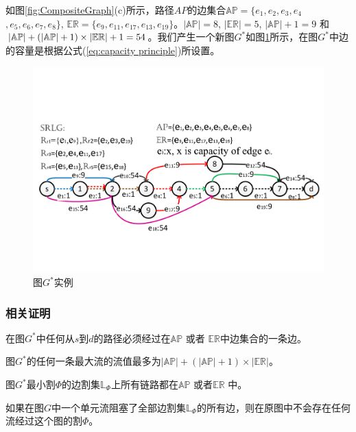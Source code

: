 \begin{frame}
  如图\ref{fig:CompositeGraph}(c)所示，路径$AP$的边集合$\mathbb{AP}=\{e_1,e_2,e_3,e_4$
$,e_5,e_6,e_7,e_8\}$, $\mathbb{\mathbb{ER}}=\{e_9,e_{11},e_{17},e_{13},e_{19}\}$。$|\mathbb{AP}|=8$, $|\mathbb{\mathbb{ER}}|=5$, $|\mathbb{AP}|+1=9$ 和 ${\left| {{\rm{\mathbb{AP}}}} \right| + \left( {\left| {{\rm{\mathbb{AP}}}} \right| + 1} \right)\times \left| {{\rm{\mathbb{E}}}{{\rm{\mathbb{R}}}}} \right| + 1}=54$。我们产生一个新图$G^*$如图\ref{fig:FlowStarGraph}所示，在图$G^*$中边的容量是根据公式(\ref{eq:capacity principle})所设置。
\begin{figure}[tp]
  \centering
  \includegraphics[width=4.5in]{figures/FlowStarGraph}
  \caption{图$G^*$实例}\label{fig:FlowStarGraph}
\end{figure}
\end{frame}

\begin{frame}
\frametitle{相关证明}
\begin{lemma}
\label{le:lemma1}
    在图$G^*$中任何从$s$到$d$的路径必须经过在$\mathbb{AP}$ 或者 $\mathbb{\mathbb{ER}}$中边集合的一条边。
\end{lemma}
\begin{lemma}
\label{le:lemma2}
    图$G^*$的任何一条最大流的流值最多为$|\mathbb{AP}|+(|\mathbb{AP}|+1)\times|\mathbb{\mathbb{ER}}|$。
\end{lemma}
\begin{lemma}
\label{le:lemma3}
    图$G^*$最小割$\Phi$的边割集$\mathbb{L}_{\Phi}$上所有链路都在$\mathbb{AP}$ 或者$\mathbb{\mathbb{ER}}$ 中。
\end{lemma}
\begin{theorem}
    如果在图$G$中一个单元流阻塞了全部边割集$\mathbb{L}_{\Phi}$的所有边，则在原图中不会存在任何流经过这个图的割$\Phi$。
\label{th:block flow}
\end{theorem}
\end{frame}

